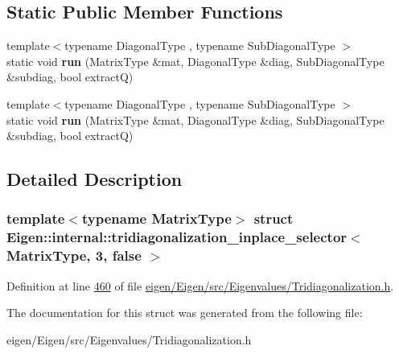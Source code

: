 \subsection*{Static Public Member Functions}
\begin{DoxyCompactItemize}
\item 
\mbox{\label{struct_eigen_1_1internal_1_1tridiagonalization__inplace__selector_3_01_matrix_type_00_013_00_01false_01_4_ada09c1e35e2754d5486fadbd5000dc5a}} 
{\footnotesize template$<$typename Diagonal\+Type , typename Sub\+Diagonal\+Type $>$ }\\static void {\bfseries run} (Matrix\+Type \&mat, Diagonal\+Type \&diag, Sub\+Diagonal\+Type \&subdiag, bool extractQ)
\item 
\mbox{\label{struct_eigen_1_1internal_1_1tridiagonalization__inplace__selector_3_01_matrix_type_00_013_00_01false_01_4_ada09c1e35e2754d5486fadbd5000dc5a}} 
{\footnotesize template$<$typename Diagonal\+Type , typename Sub\+Diagonal\+Type $>$ }\\static void {\bfseries run} (Matrix\+Type \&mat, Diagonal\+Type \&diag, Sub\+Diagonal\+Type \&subdiag, bool extractQ)
\end{DoxyCompactItemize}


\subsection{Detailed Description}
\subsubsection*{template$<$typename Matrix\+Type$>$\newline
struct Eigen\+::internal\+::tridiagonalization\+\_\+inplace\+\_\+selector$<$ Matrix\+Type, 3, false $>$}



Definition at line \hyperlink{eigen_2_eigen_2src_2_eigenvalues_2_tridiagonalization_8h_source_l00460}{460} of file \hyperlink{eigen_2_eigen_2src_2_eigenvalues_2_tridiagonalization_8h_source}{eigen/\+Eigen/src/\+Eigenvalues/\+Tridiagonalization.\+h}.



The documentation for this struct was generated from the following file\+:\begin{DoxyCompactItemize}
\item 
eigen/\+Eigen/src/\+Eigenvalues/\+Tridiagonalization.\+h\end{DoxyCompactItemize}
